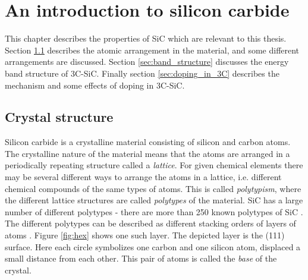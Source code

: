 





\chapter{An introduction to silicon carbide}
\label{sec:sic}
This chapter describes the properties of SiC which are relevant to this thesis. Section \ref{sec:crystal_structure} describes the atomic arrangement in the material, and some different arrangements are discussed. Section \ref{sec:band_structure} discusses the energy band structure of 3C-SiC. Finally section \ref{sec:doping_in_3C} describes the mechanism and some effects of doping in 3C-SiC. 

\section{Crystal structure}
\label{sec:crystal_structure}
Silicon carbide is a crystalline material consisting of silicon and carbon atoms. The crystalline nature of the material means that the atoms are arranged in a periodically repeating structure called a \emph{lattice}. For given chemical elements there may be several different ways to arrange the atoms in a lattice, i.e. different chemical compounds of the same types of atoms. This is called \emph{polytypism}, where the different lattice structures are called \emph{polytypes} of the material. SiC has a large number of different polytypes - there are more than 250 known polytypes of SiC \cite{Cheung2006}. The different polytypes can be described as different stacking orders of layers of atoms \cite{Mirgorodsky1995}. Figure \ref{fig:hex} shows one such layer. The depicted layer is the (111) surface. Here each circle symbolizes one carbon and one silicon atom, displaced a small distance from each other. This pair of atoms is called the \emph{base} of the crystal. 

